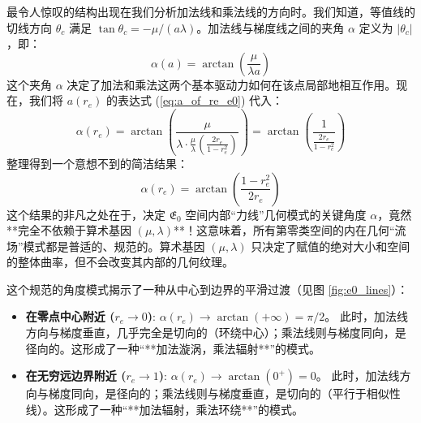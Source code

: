 \documentclass[a4paper,12pt]{book}
\numberwithin{problem}{section}
\numberwithin{definition}{section}
\numberwithin{lemma}{section}
\numberwithin{proposition}{section}
\numberwithin{theorem}{section}
\numberwithin{grammar}{section}
\numberwithin{program}{section}
\numberwithin{convention}{section}
\numberwithin{corollary}{section}
\begin{document}
最令人惊叹的结构出现在我们分析加法线和乘法线的方向时。我们知道，等值线的切线方向 $\theta_c$ 满足 $\tan\theta_c = -\mu/(a\lambda)$。加法线与梯度线之间的夹角 $\alpha$ 定义为 $|\theta_c|$，即：
\[ \alpha(a) = \arctan\left(\frac{\mu}{\lambda a}\right) \]
这个夹角 $\alpha$ 决定了加法和乘法这两个基本驱动力如何在该点局部地相互作用。现在，我们将 $a(r_e)$ 的表达式 (\ref{eq:a_of_re_e0}) 代入：
\[
    \alpha(r_e) = \arctan\left(\frac{\mu}{\lambda \cdot \frac{\mu}{\lambda} \left( \frac{2r_e}{1-r_e^2} \right)}\right) = \arctan\left(\frac{1}{\frac{2r_e}{1-r_e^2}}\right)
\]
整理得到一个意想不到的简洁结果：
\begin{equation}
    \alpha(r_e) = \arctan\left(\frac{1-r_e^2}{2r_e}\right)
    \label{eq:alpha_of_re_e0}
\end{equation}
这个结果的非凡之处在于，决定 $\mathfrak{E}_0$ 空间内部“力线”几何模式的关键角度 $\alpha$，竟然**完全不依赖于算术基因 $(\mu, \lambda)$**！这意味着，所有第零类空间的内在几何“流场”模式都是普适的、规范的。算术基因 $(\mu, \lambda)$ 只决定了赋值的绝对大小和空间的整体曲率，但不会改变其内部的几何纹理。

这个规范的角度模式揭示了一种从中心到边界的平滑过渡（见图 \ref{fig:e0_lines}）：
\begin{itemize}
    \item \textbf{在零点中心附近 ($r_e \to 0$)}: $\alpha(r_e) \to \arctan(+\infty) = \pi/2$。
    此时，加法线方向与梯度垂直，几乎完全是切向的（环绕中心）；乘法线则与梯度同向，是径向的。这形成了一种“**加法漩涡，乘法辐射**”的模式。
    \item \textbf{在无穷远边界附近 ($r_e \to 1$)}: $\alpha(r_e) \to \arctan(0^+) = 0$。
    此时，加法线方向与梯度同向，是径向的；乘法线则与梯度垂直，是切向的（平行于相似性线）。这形成了一种“**加法辐射，乘法环绕**”的模式。
\end{itemize}
\end{document}
